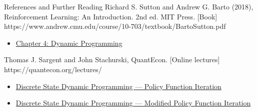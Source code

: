 \begin{frame}{References and Further Reading}
  {Richard S. Sutton and Andrew G. Barto (2018), Reinforcement Learning: An Introduction. 2nd ed. MIT Press. [Book]}
  {https://www.andrew.cmu.edu/course/10-703/textbook/BartoSutton.pdf}
  {\begin{itemize}
\item \href{https://www.andrew.cmu.edu/course/10-703/textbook/BartoSutton.pdf\#page=95}{Chapter 4: Dynamic Programming}
\end{itemize}}
  {Thomas J. Sargent and John Stachurski, QuantEcon. [Online lectures]}
  {https://quantecon.org/lectures/}
  {\begin{itemize}
\item \href{https://tools-techniques.quantecon.org/discrete_dp.html\#policy-function-iteration}{Discrete State Dynamic Programming — Policy Function Iteration}
\item \href{https://tools-techniques.quantecon.org/discrete_dp.html\#modified-policy-function-iteration}{Discrete State Dynamic Programming — Modified Policy Function Iteration}
\end{itemize}}
\end{frame}

